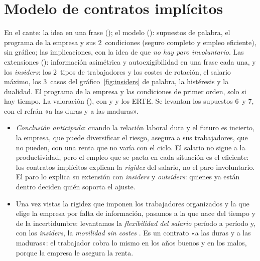 \documentclass[11pt]{article}
\begin{document}
\section{Modelo de contratos implícitos}\label{sec:contratos-implicitos}

\begin{notaopositor}
En el cante: la idea en una frase (); el modelo (): supuestos de palabra, el programa de la empresa y sus 2~condiciones (seguro completo y empleo eficiente), sin gráfico; las implicaciones, con la idea de que \emph{no hay paro involuntario}. Las extensiones (): información asimétrica y autoexigibilidad en una frase cada una, y los \emph{insiders}: los 2~tipos de trabajadores y los costes de rotación, el salario máximo, los 3~casos del gráfico~\ref{fig:insiders} de palabra, la histéresis y la dualidad. El programa de la empresa y las condiciones de primer orden, solo si hay tiempo. La valoración (), con  y  y los ERTE. Se levantan los supuestos 6~y 7, con el refrán «a las duras y a las maduras».
\end{notaopositor}

\begin{itemize}
\item \emph{Conclusión anticipada}: cuando la relación laboral dura y el futuro es incierto, la empresa, que puede diversificar el riesgo, asegura a sus trabajadores, que no pueden, con una renta que no varía con el ciclo. El salario no sigue a la productividad, pero el empleo que se pacta en cada situación es el eficiente: los contratos implícitos explican la \emph{rigidez} del salario, no el paro involuntario. El paro lo explica su extensión con \emph{insiders} y \emph{outsiders}: quienes ya están dentro deciden quién soporta el ajuste.
\item Una vez vistas la rigidez que imponen los trabajadores organizados y la que elige la empresa por falta de información, pasamos a la que nace del tiempo y de la incertidumbre: levantamos la \emph{flexibilidad del salario} período a período y, con los \emph{insiders}, la \emph{movilidad sin costes} . Es un contrato «a las duras y a las maduras»: el trabajador cobra lo mismo en los años buenos y en los malos, porque la empresa le asegura la renta.
\end{itemize}

\end{document}
